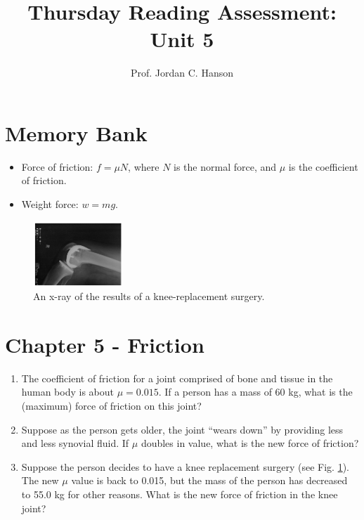 \documentclass{article}
\begin{document}
\title{Thursday Reading Assessment: Unit 5}
\author{Prof. Jordan C. Hanson}

\maketitle

\section{Memory Bank}

\begin{itemize}
\item Force of friction: $f = \mu N$, where $N$ is the normal force, and $\mu$ is the coefficient of friction.
\item Weight force: $w = mg$.
\end{itemize}
\begin{figure}[ht]
\centering
\includegraphics[width=0.3\textwidth]{bone.png}
\caption{\label{fig:bone} An x-ray of the results of a knee-replacement surgery.}
\end{figure}
\section{Chapter 5 - Friction}
\begin{enumerate}
\item The coefficient of friction for a joint comprised of bone and tissue in the human body is about $\mu = 0.015$.  If a person has a mass of 60 kg, what is the (maximum) force of friction on this joint? \\ \vspace{2cm}
\item Suppose as the person gets older, the joint ``wears down'' by providing less and less synovial fluid.  If $\mu$ doubles in value, what is the new force of friction? \\ \vspace{2cm}
\item Suppose the person decides to have a knee replacement surgery (see Fig. \ref{fig:bone}).  The new $\mu$ value is back to 0.015, but the mass of the person has decreased to 55.0 kg for other reasons.  What is the new force of friction in the knee joint?
\end{enumerate}
\end{document}
